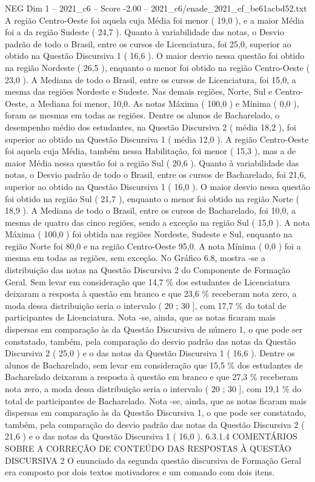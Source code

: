 \begin{textsample}{NEG Dim 1 – 2021\_c6 – Score -2.00 – 2021\_c6/enade\_2021\_ef\_be61acbd52.txt}
A região Centro-Oeste foi aquela cuja Média foi menor ( 19,0 ), e a maior Média foi a da região Sudeste ( 24,7 ).
Quanto à variabilidade das notas, o Desvio padrão de todo o Brasil, entre os cursos de Licenciatura, foi 25,0, superior ao obtido na Questão Discursiva 1 ( 16,6 ).
O maior desvio nessa questão foi obtido na região Nordeste ( 26,5 ), enquanto o menor foi obtido na região Centro-Oeste ( 23,0 ).
A Mediana de todo o Brasil, entre os cursos de Licenciatura, foi 15,0, a mesma das regiões Nordeste e Sudeste.
Nas demais regiões, Norte, Sul e Centro-Oeste, a Mediana foi menor, 10,0.
As notas Máxima ( 100,0 ) e Mínima ( 0,0 ), foram as mesmas em todas as regiões.
Dentre os alunos de Bacharelado, o desempenho médio dos estudantes, na Questão Discursiva 2 ( média 18,2 ), foi superior ao obtido na Questão Discursiva 1 ( média 12,0 ).
A região Centro-Oeste foi aquela cuja Média, também nessa Habilitação, foi menor ( 15,3 ), mas a de maior Média nessa questão foi a região Sul ( 20,6 ).
Quanto à variabilidade das notas, o Desvio padrão de todo o Brasil, entre os cursos de Bacharelado, foi 21,6, superior ao obtido na Questão Discursiva 1 ( 16,0 ).
O maior desvio nessa questão foi obtido na região Sul ( 21,7 ), enquanto o menor foi obtido na região Norte ( 18,9 ).
A Mediana de todo o Brasil, entre os cursos de Bacharelado, foi 10,0, a mesma de quatro das cinco regiões, sendo a exceção na região Sul ( 15,0 ).
A nota Máxima ( 100,0 ) foi obtida nas regiões Nordeste, Sudeste e Sul, enquanto na região Norte foi 80,0 e na região Centro-Oeste 95,0.
A nota Mínima ( 0,0 ) foi a mesma em todas as regiões, sem exceção.
No Gráfico 6.8, mostra -se a distribuição das notas na Questão Discursiva 2 do Componente de Formação Geral.
Sem levar em consideração que 14,7 \% dos estudantes de Licenciatura deixaram a resposta à questão em branco e que 23,6 \% receberam nota zero, a moda dessa distribuição seria o intervalo ( 20 ; 30 ], com 17,7 \% do total de participantes de Licenciatura.
Nota -se, ainda, que as notas ficaram mais dispersas em comparação às da Questão Discursiva de número 1, o que pode ser constatado, também, pela comparação do desvio padrão das notas da Questão Discursiva 2 ( 25,0 ) e o das notas da Questão Discursiva 1 ( 16,6 ).
Dentre os alunos de Bacharelado, sem levar em consideração que 15,5 \% dos estudantes de Bacharelado deixaram a resposta à questão em branco e que 27,3 \% receberam nota zero, a moda dessa distribuição seria o intervalo ( 20 ; 30 ], com 19,1 \% do total de participantes de Bacharelado.
Nota -se, ainda, que as notas ficaram mais dispersas em comparação às da Questão Discursiva 1, o que pode ser constatado, também, pela comparação do desvio padrão das notas da Questão Discursiva 2 ( 21,6 ) e o das notas da Questão Discursiva 1 ( 16,0 ). 6.3.1.4 COMENTÁRIOS SOBRE A CORREÇÃO DE CONTEÚDO DAS RESPOSTAS À QUESTÃO DISCURSIVA 2 O enunciado da segunda questão discursiva de Formação Geral era composto por dois textos motivadores e um comando com dois itens.

\end{textsample}
